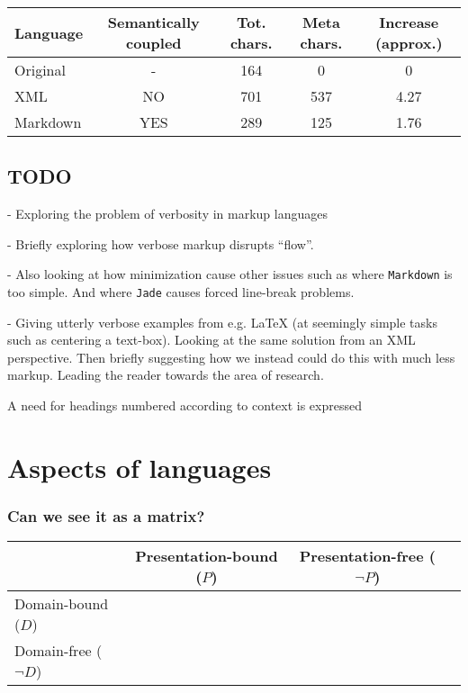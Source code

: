 \documentclass{scrreprt}
\begin{document}
\vspace{12pt}
\begin{tabular}{l c c c c}
Language
& Semantically coupled
& Tot. chars.
& Meta chars.
& Increase (approx.)
\\
\hline
Original & -   & 164 & 0   & 0\\
XML      & NO  & 701 & 537 & 4.27\\
Markdown & YES & 289 & 125 & 1.76
\end{tabular}
\vspace{12pt}






\section{TODO}
- Exploring the problem of verbosity in markup languages

- Briefly exploring how verbose markup disrupts ``flow''.

- Also looking at how minimization cause other issues such as where \texttt{Markdown} is too simple. And where \texttt{Jade} causes forced line-break problems.

- Giving utterly verbose examples from e.g. LaTeX (at seemingly simple tasks such as centering a text-box). Looking at the same solution from an XML perspective. Then briefly suggesting how we instead could do this with much less markup. Leading the reader towards the area of research.

A need for headings numbered according to context is expressed





\chapter{Aspects of languages}
\subsection{Can we see it as a matrix?}

\begin{tabular}{ l | c | c | c }
    & Presentation-bound (\(P\)) & Presentation-free (\(\neg P \))
    \\ \hline

    Domain-bound (\(D\)) 
    \\ \hline

    Domain-free (\(\neg D\))
\end{tabular}
\end{document}
